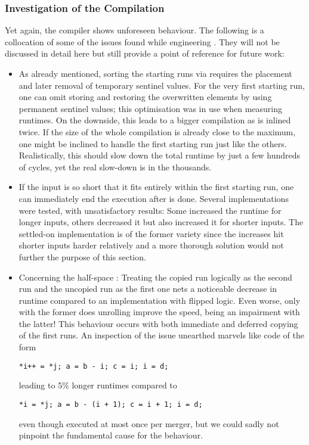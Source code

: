 \subsubsection*{Investigation of the Compilation}
\label{subsubsec:tasklet:merge:compilation}

Yet again, the compiler shows unforeseen behaviour.
The following is a collocation of some of the issues found while engineering \MS{}.
They will not be discussed in detail here but still provide a point of reference for future work:
\begin{itemize}
	\item
	As already mentioned, sorting the starting runs via \ShS{} requires the placement and later removal of temporary sentinel values.
	For the very first starting run, one can omit storing and restoring the overwritten elements by using permanent sentinel values;
	this optimisation was in use when measuring runtimes.
	On the downside, this leads to a bigger compilation as \ShS{} is inlined twice.
	If the size of the whole compilation is already close to the maximum, one might be inclined to handle the first starting run just like the others.
	Realistically, this should slow down the total runtime by just a few hundreds of cycles, yet the real slow-down is in the thousands.

	\item
	If the input is so short that it fits entirely within the first starting run, one can immediately end the execution after \ShS{} is done.
	Several implementations were tested, with unsatisfactory results:
	Some increased the runtime for longer inputs, others decreased it but also increased it for shorter inputs.
	The settled-on implementation is of the former variety since the increases hit shorter inputs harder relatively and a more thorough solution would not further the purpose of this section.

	\item
	Concerning the half-space \MS{}:
	Treating the copied run logically as the second run and the uncopied run as the first one nets a noticeable decrease in runtime compared to an implementation with flipped logic.
	Even worse, only with the former does unrolling improve the speed, being an impairment with the latter!
	This behaviour occurs with both immediate and deferred copying of the first runs.
	An inspection of the issue unearthed marvels like code of the form
	\begin{center}
		\vspace{-\baselineskip}
		\texttt{*i++ = *j; a = b - i; c = i; i = d;}
	\end{center}
	leading to 5\% longer runtimes compared to
	\begin{center}
		\texttt{*i = *j; a = b - (i + 1); c = i + 1; i = d;}
	\end{center}
	even though executed at most once per merger, but we could sadly not pinpoint the fundamental cause for the behaviour.
\end{itemize}

